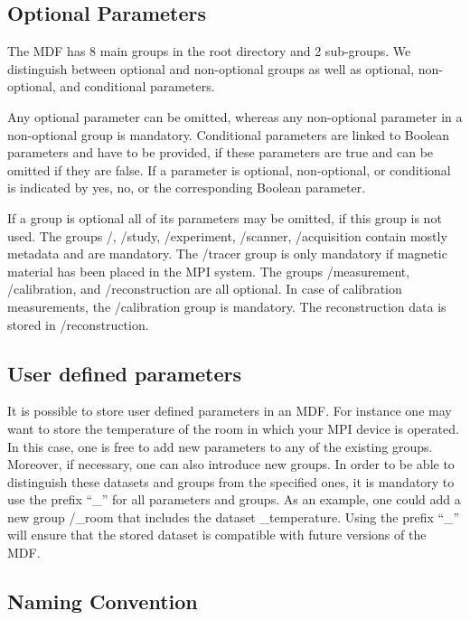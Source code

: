 \documentclass[landscape,a4paper]{article} %
\newcommand{\inlvar}[1]{{\ttfamily#1}}
\begin{document}
\begin{multicols}{2}
\subsection{Optional Parameters}

The MDF has 8 main groups in the root directory and 2 sub-groups. We distinguish between optional and non-optional groups as well as optional, non-optional, and conditional parameters. 

Any optional parameter can be omitted, whereas any non-optional parameter in a non-optional group is mandatory. Conditional parameters are linked to Boolean parameters and have to be provided, if these parameters are true and can be omitted if they are false. If a parameter is optional, non-optional, or conditional is indicated by yes, no, or the corresponding Boolean parameter.

If a group is optional all of its parameters may be omitted, if this group is not used. The groups \inlvar{/}, \inlvar{/study}, \inlvar{/experiment}, \inlvar{/scanner}, \inlvar{/acquisition} contain mostly metadata and are mandatory. The \inlvar{/tracer} group is only mandatory if magnetic material has been placed in the MPI system. The groups \inlvar{/measurement}, \inlvar{/calibration}, and \inlvar{/reconstruction} are all optional. In case of calibration measurements, the \inlvar{/calibration} group is mandatory. The reconstruction data is stored in \inlvar{/reconstruction}. 

\subsection{User defined parameters}

It is possible to store user defined parameters in an MDF. For instance one may want to store the temperature of the room in which your MPI device is operated. In this case, one is free to add new parameters to any of the existing groups. Moreover, if necessary, one can also introduce new groups. In order to be able to distinguish these datasets and groups from the specified ones, it is mandatory to use the prefix ``\inlvar{\_}'' for all parameters and groups. As an example, one could add a new group \inlvar{/\_room} that includes the dataset \inlvar{\_temperature}. Using the prefix ``\inlvar{\_}'' will ensure that the stored dataset is compatible with future versions of the MDF.

\subsection{Naming Convention}


\end{multicols}
\end{document}
